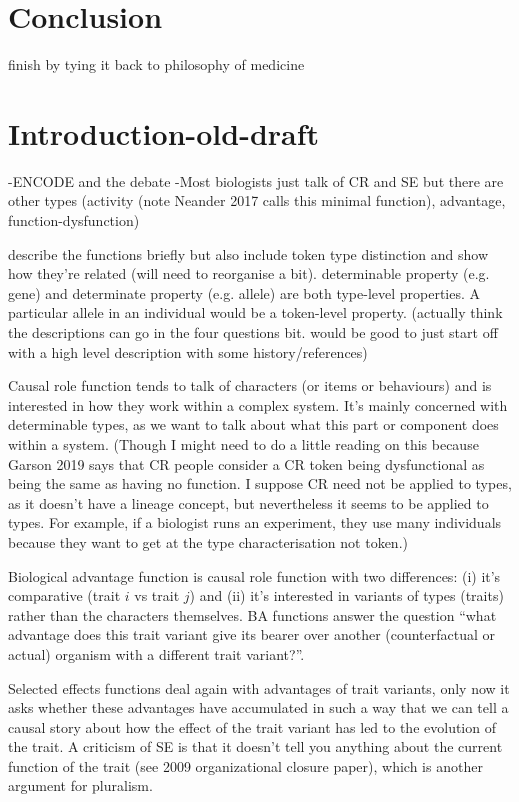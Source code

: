 \documentclass{article}
\begin{document}
\section{Conclusion}
\label{sec:conclusion-1}

finish by tying it back to philosophy of medicine

\section{Introduction-old-draft}
\label{sec:introduction-1}

-ENCODE and the debate
-Most biologists just talk of CR and SE but there are other types (activity (note Neander 2017 calls this minimal function), advantage, function-dysfunction)

describe the functions briefly but also include token type distinction and show how they're related (will need to reorganise a bit). determinable property (e.g. gene) and determinate property (e.g. allele) are both type-level properties. A particular allele in an individual would be a token-level property. (actually think the descriptions can go in the four questions bit. would be good to just start off with a high level description with some history/references)

Causal role function tends to talk of characters (or items or behaviours) and is interested in how they work within a complex system. It's mainly concerned with determinable types, as we want to talk about what this part or component does within a system. (Though I might need to do a little reading on this because Garson 2019 says that CR people consider a CR token being dysfunctional as being the same as having no function. I suppose CR need not be applied to types, as it doesn't have a lineage concept, but nevertheless it seems to be applied to types. For example, if a biologist runs an experiment, they use many individuals because they want to get at the type characterisation not token.)

Biological advantage function is causal role function with two differences: (i) it's comparative (trait $i$ vs trait $j$) and (ii) it's interested in variants of types (traits) rather than the characters themselves. BA functions answer the question ``what advantage does this trait variant give its bearer over another (counterfactual or actual) organism with a different trait variant?''.

Selected effects functions deal again with advantages of trait variants, only now it asks whether these advantages have accumulated in such a way that we can tell a causal story about how the effect of the trait variant has led to the evolution of the trait. A criticism of SE is that it doesn't tell you anything about the current function of the trait (see 2009 organizational closure paper), which is another argument for pluralism.
\end{document}
